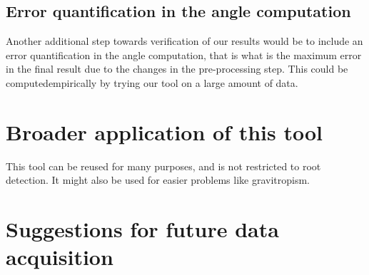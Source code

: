 %
%




\subsection{Error quantification in the angle computation}

Another additional step towards verification of our results would be to include an error quantification in the angle computation, that is what is the maximum error in the final result due to the changes in the pre-processing step. This could be computedempirically by trying our tool on a large amount of data.


\section{Broader application of this tool}

This tool can be reused for many purposes, and is not restricted to root detection.
It might also be used for easier problems like gravitropism.



\section{Suggestions for future data acquisition}

